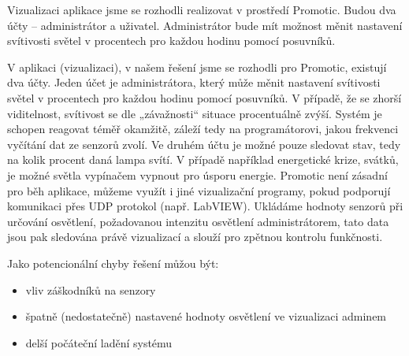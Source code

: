 Vizualizaci aplikace jsme se rozhodli realizovat v prostředí Promotic. Budou dva účty -- administrátor a uživatel. Administrátor bude mít možnost měnit nastavení svítivosti světel v procentech pro každou hodinu pomocí posuvníků.

V aplikaci (vizualizaci), v našem řešení jsme se rozhodli pro Promotic, existují dva účty. Jeden účet je administrátora, který může měnit nastavení svítivosti světel v procentech pro každou hodinu pomocí posuvníků. V případě, že se zhorší viditelnost, svítivost se dle „závažnosti“ situace procentuálně zvýší. Systém je schopen reagovat téměř okamžitě, záleží tedy na programátorovi, jakou frekvenci vyčítání dat ze senzorů zvolí. Ve druhém účtu je možné pouze sledovat stav, tedy na kolik procent daná lampa svítí. V případě například energetické krize, svátků, je možné světla vypínačem vypnout pro úsporu energie. Promotic není zásadní pro běh aplikace, můžeme využít i jiné vizualizační programy, pokud podporují komunikaci přes UDP protokol (např. LabVIEW). Ukládáme hodnoty senzorů při určování osvětlení, požadovanou intenzitu osvětlení administrátorem, tato data jsou pak sledována právě vizualizací a slouží pro zpětnou kontrolu funkčnosti. 


Jako potencionální chyby řešení můžou být: 
\begin{itemize}
    \item vliv záškodníků na senzory
    \item špatně (nedostatečně) nastavené hodnoty osvětlení ve vizualizaci adminem
    \item delší počáteční ladění systému
\end{itemize}




\endinput
